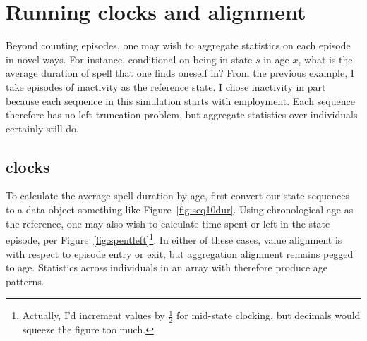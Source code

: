 \documentclass{article}
\begin{document}
\FloatBarrier
\section{Running clocks and alignment}
Beyond counting episodes, one may wish to aggregate statistics on each episode
in novel ways. For instance, conditional on being in state $s$ in age $x$, what
is the average duration of spell that one finds oneself in? From the previous
example, I take episodes of inactivity as the reference state. I chose
inactivity in part because each sequence in this simulation starts with employment. Each
sequence therefore has no left truncation problem, but aggregate statistics over
individuals certainly still do. 

\subsection{clocks}
To calculate the average spell duration by age, first convert our state
sequences to a data object something like Figure~\ref{fig:seq10dur}. Using chronological age as the reference, one may also wish to calculate time
spent or left in the state episode, per
Figure~\ref{fig:spentleft}\footnote{Actually, I'd increment values by
$\frac{1}{2}$ for mid-state clocking, but decimals would squeeze the figure too
much.}. In either of these cases, value alignment is with respect to episode
entry or exit, but aggregation alignment remains pegged to age. Statistics
across individuals in an array with therefore produce age patterns.
\end{document}
